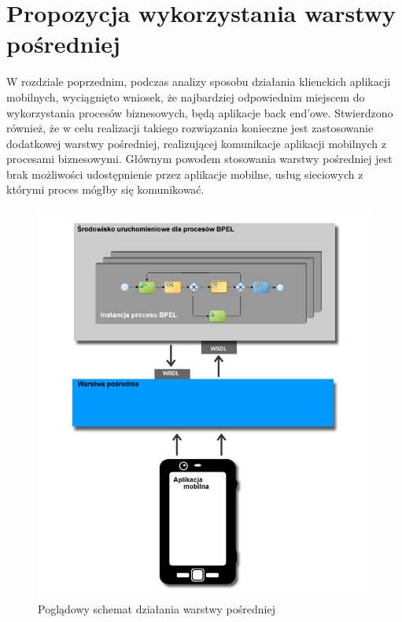 \chapter{Propozycja wykorzystania warstwy pośredniej}
\label{cha:middleware}

W rozdziale poprzednim, podczas analizy sposobu działania klienckich aplikacji mobilnych, wyciągnięto wniosek, że najbardziej odpowiednim miejscem do wykorzystania procesów biznesowych, będą aplikacje back end'owe. Stwierdzono również, że w celu realizacji takiego rozwiązania konieczne jest zastosowanie dodatkowej warstwy pośredniej, realizującej komunikacje aplikacji mobilnych z procesami biznesowymi. Głównym powodem stosowania warstwy pośredniej jest brak możliwości udostępnienie przez aplikacje mobilne, usług sieciowych z którymi proces mógłby się komunikować. 

\begin{figure}[h]
\centerline{\includegraphics[scale=0.5]{middlewareConceptDiagram}}
\caption{Poglądowy schemat działania warstwy pośredniej}
\label{fig:middlewareConceptDiagram}
\end{figure}

